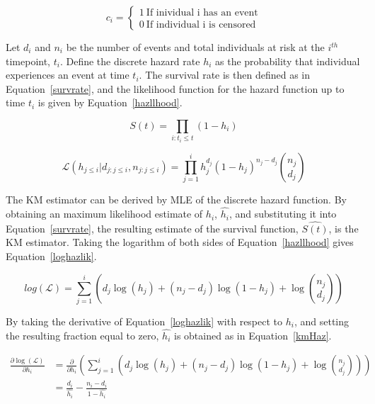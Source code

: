 \begin{equation}
    c_{i} = \begin{cases}
        1 \ \text{If inividual i has an event} \\
        0 \ \text{If individual i is censored}
    \end{cases}
    \label{censInd}  
\end{equation}

Let $d_i$ and $n_i$ be the number of events and total individuals at risk at the $i^{th}$ timepoint, $t_i$. Define the discrete hazard rate $h_i$ as the probability that individual experiences an event at time $t_i$. The survival rate is then defined as in Equation~\ref{survrate}, and the likelihood function for the hazard function up to time $t_i$ is given by Equation~\ref{hazllhood}.

\begin{equation}
    S(t) = \prod_{i:t_i \leq t} (1 - h_i)
    \label{survrate}
\end{equation}

\begin{equation}
    \mathcal{L}(h_{j\leq i}|d_{j:j\leq i}, n_{j:j\leq i}) = \prod_{j=1}^i h_j^{d_j}(1-h_j)^{n_j-d_j}\binom{n_j}{d_j}
    \label{hazllhood}
\end{equation}

The KM estimator can be derived by MLE of the discrete hazard function. By obtaining an maximum likelihood estimate of $h_i$, $\hat{h_i}$, and substituting it into Equation~\ref{survrate}, the resulting estimate of the survival function, $\hat{S(t)}$, is the KM estimator. Taking the logarithm of both sides of Equation~\ref{hazllhood} gives Equation~\ref{loghazlik}.

\begin{equation}
    log(\mathcal{L}) = \sum_{j=1}^i \left(d_j\log(h_j)+(n_j-d_j)\log(1-h_j) + \log \binom{n_j}{d_j}\right)
    \label{loghazlik}
\end{equation}

By taking the derivative of Equation~\ref{loghazlik} with respect to $h_i$, and setting the resulting fraction equal to zero, $\hat{h_i}$ is obtained as in Equation~\ref{kmHaz}.

\begin{align}
    \frac{\partial \log(\mathcal{L})}{\partial h_i} &= \frac{\partial}{\partial h_i}\left(\sum_{j=1}^i \left(d_j\log(h_j)+(n_j-d_j)\log(1-h_j) + \log \binom{n_j}{d_j}\right)\right) \\
    &= \frac{d_i}{\hat{h_i}} - \frac{n_i - d_i}{1 - \hat{h_i}}
\end{align}

